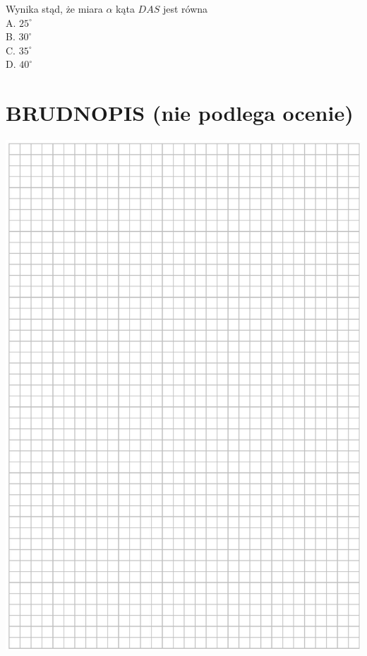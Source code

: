 \documentclass[10pt]{article}
\begin{document}
Wynika stąd, że miara \(\alpha\) kąta \(D A S\) jest równa\\
A. \(25^{\circ}\)\\
B. \(30^{\circ}\)\\
C. \(35^{\circ}\)\\
D. \(40^{\circ}\)

\section*{BRUDNOPIS (nie podlega ocenie)}
\begin{center}
\includegraphics[max width=\textwidth]{2024_11_21_46d945490f1b2eff1c8eg-11}
\end{center}
\end{document}
